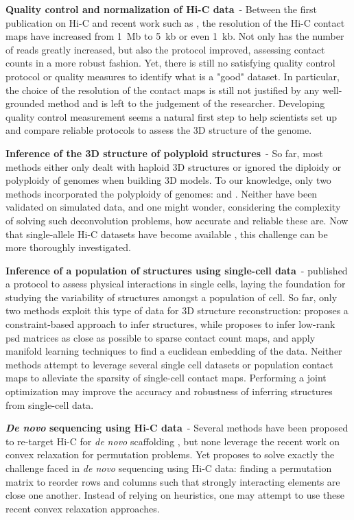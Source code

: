 \textbf{Quality control and normalization of Hi-C data}\ - Between the first
publication on Hi-C \citep{lieberman-aiden:comprehensive} and recent work such
as \citet{rao:3d, jin:high-resolution}, the resolution of the Hi-C contact
maps have increased from 1~Mb to 5~kb or even 1~kb. Not only has the number of
reads greatly increased, but also the protocol improved, assessing contact
counts in a more robust fashion. Yet, there is still no satisfying quality
control protocol or quality measures to identify what is a "good" dataset. In
particular, the choice of the resolution of the contact maps is still not
justified by any well-grounded method and is left to the judgement of the
researcher. Developing quality control measurement seems a natural first step
to help scientists set up and compare reliable protocols to assess the 3D
structure of the genome.

\textbf{Inference of the 3D structure of polyploid structures}\ - So far, most
methods either only dealt with haploid 3D structures or ignored the diploidy
or polyploidy of genomes when building 3D models. To our knowledge, only two
methods incorporated the polyploidy of genomes: \citet{kalhor:genome} and
\citet{ay:identifying}. Neither have been validated on simulated data, and
one might wonder, considering the complexity of solving such deconvolution
problems, how accurate and reliable these are. Now that single-allele Hi-C
datasets have become available \citep{deng:bipartite}, this challenge can be more
thoroughly investigated.

\textbf{Inference of a population of structures using single-cell data}\ -
\citet{nagano:single-cell} published a protocol to assess physical
interactions in single cells, laying the foundation for studying the
variability of structures amongst a population of cell. So far, only two
methods exploit this type of data for 3D structure reconstruction:
\citet{nagano:single-cell} proposes a constraint-based approach to infer
structures, while \citet{paulsen:manifold} proposes to infer low-rank psd
matrices as close as possible to sparse contact count maps, and apply manifold
learning techniques to find a euclidean embedding of the data. Neither methods
attempt to leverage several single cell datasets or population contact maps to
alleviate the sparsity of single-cell contact maps. Performing a joint
optimization may improve the accuracy and robustness of inferring structures
from single-cell data.

\textbf{\textit{De novo} sequencing using Hi-C data}\ - Several methods have
been proposed to re-target Hi-C for \textit{de novo} scaffolding
\citep{burton:chromosome, kaplan:high-throughput, marie-nelly:high-quality},
but none leverage the recent work on convex relaxation for permutation
problems. Yet \citet{fogel:convex} proposes to solve exactly the challenge
faced in \textit{de novo} sequencing using Hi-C data: finding a permutation
matrix to reorder rows and columns such that strongly interacting elements are
close one another. Instead of relying on heuristics, one may attempt to use
these recent convex relaxation approaches.

